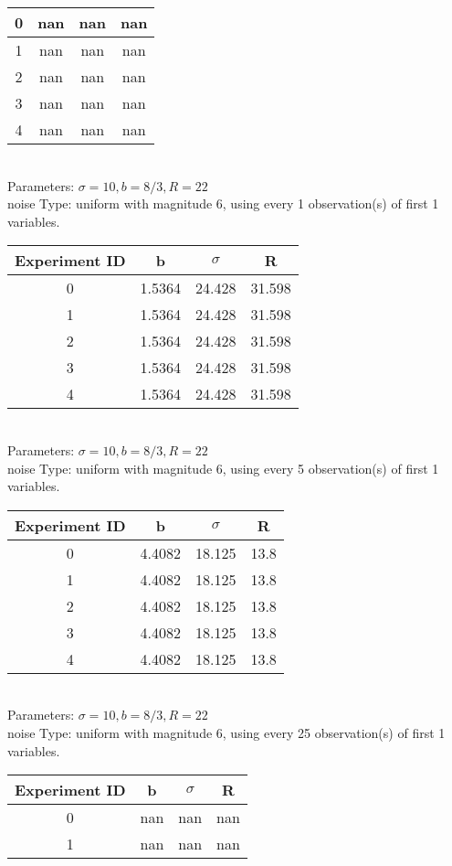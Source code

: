 \begin{multicols}{3}
\begin{tabular}{cccc}
0 & nan & nan & nan\\ \hline 
 1 & nan & nan & nan\\ \hline 
 2 & nan & nan & nan\\ \hline 
 3 & nan & nan & nan\\ \hline 
 4 & nan & nan & nan\\ \hline 
 \end{tabular}\\
Parameters: $\sigma=10, b=8/3, R=22$\\
noise Type: uniform with magnitude 6, using every 1 observation(s) of first 1 variables.\\
\begin{tabular}{cccc}
\hline Experiment ID & b & $\sigma$ & R \\ \hline 
0 & 1.5364 & 24.428 & 31.598\\ \hline 
 1 & 1.5364 & 24.428 & 31.598\\ \hline 
 2 & 1.5364 & 24.428 & 31.598\\ \hline 
 3 & 1.5364 & 24.428 & 31.598\\ \hline 
 4 & 1.5364 & 24.428 & 31.598\\ \hline 
 \end{tabular}\\
Parameters: $\sigma=10, b=8/3, R=22$\\
noise Type: uniform with magnitude 6, using every 5 observation(s) of first 1 variables.\\
\begin{tabular}{cccc}
\hline Experiment ID & b & $\sigma$ & R \\ \hline 
0 & 4.4082 & 18.125 & 13.8\\ \hline 
 1 & 4.4082 & 18.125 & 13.8\\ \hline 
 2 & 4.4082 & 18.125 & 13.8\\ \hline 
 3 & 4.4082 & 18.125 & 13.8\\ \hline 
 4 & 4.4082 & 18.125 & 13.8\\ \hline 
 \end{tabular}\\
Parameters: $\sigma=10, b=8/3, R=22$\\
noise Type: uniform with magnitude 6, using every 25 observation(s) of first 1 variables.\\
\begin{tabular}{cccc}
\hline Experiment ID & b & $\sigma$ & R \\ \hline 
0 & nan & nan & nan\\ \hline 
 1 & nan & nan & nan\\ \hline 

\end{tabular}
\end{multicols}

